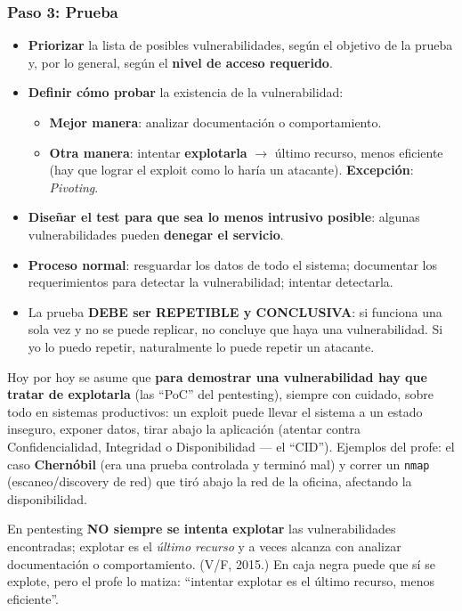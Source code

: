 \documentclass[../main.tex]{subfiles}
\begin{document}
\subsubsection{Paso 3: Prueba}

\begin{itemize}
    \item \textbf{Priorizar} la lista de posibles vulnerabilidades, según el objetivo de la
    prueba y, por lo general, según el \textbf{nivel de acceso requerido}.
    \item \textbf{Definir cómo probar} la existencia de la vulnerabilidad:
    \begin{itemize}
        \item \textbf{Mejor manera}: analizar documentación o comportamiento.
        \item \textbf{Otra manera}: intentar \textbf{explotarla} $\rightarrow$ último recurso,
        menos eficiente (hay que lograr el exploit como lo haría un atacante).
        \textbf{Excepción}: \emph{Pivoting}.
    \end{itemize}
    \item \textbf{Diseñar el test para que sea lo menos intrusivo posible}: algunas
    vulnerabilidades pueden \textbf{denegar el servicio}.
    \item \textbf{Proceso normal}: resguardar los datos de todo el sistema; documentar los
    requerimientos para detectar la vulnerabilidad; intentar detectarla.
    \item La prueba \textbf{DEBE ser REPETIBLE y CONCLUSIVA}: si funciona una sola vez y no se
    puede replicar, no concluye que haya una vulnerabilidad. Si yo lo puedo repetir,
    naturalmente lo puede repetir un atacante.
\end{itemize}

\begin{destacado}
Hoy por hoy se asume que \textbf{para demostrar una vulnerabilidad hay que tratar de
explotarla} (las ``PoC'' del pentesting), siempre con cuidado, sobre todo en sistemas
productivos: un exploit puede llevar el sistema a un estado inseguro, exponer datos, tirar
abajo la aplicación (atentar contra Confidencialidad, Integridad o Disponibilidad --- el
``CID''). Ejemplos del profe: el caso \textbf{Chernóbil} (era una prueba controlada y
terminó mal) y correr un \texttt{nmap} (escaneo/discovery de red) que tiró abajo la red de
la oficina, afectando la disponibilidad.
\end{destacado}

\begin{ojo}
En pentesting \textbf{NO siempre se intenta explotar} las vulnerabilidades encontradas;
explotar es el \emph{último recurso} y a veces alcanza con analizar documentación o
comportamiento. (V/F, 2015.) En caja negra puede que sí se explote, pero el profe lo matiza:
``intentar explotar es el último recurso, menos eficiente''.
\end{ojo}
\end{document}
